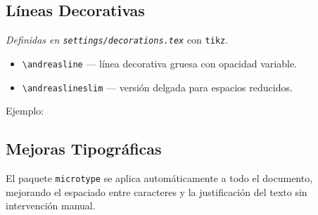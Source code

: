 \documentclass[/work/src/main.tex]{subfiles}
\begin{document}
\subsection{Líneas Decorativas}
\label{sec:decoraciones}

\emph{Definidas en \texttt{settings/decorations.tex}} con \texttt{tikz}.

\begin{itemize}
    \item \texttt{\textbackslash andreasline} — línea decorativa gruesa con opacidad variable.
    \item \texttt{\textbackslash andreaslineslim} — versión delgada para espacios reducidos.
\end{itemize}

Ejemplo:

\andreasline

\subsection{Mejoras Tipográficas}
\label{sec:microtype}

El paquete \texttt{microtype} se aplica automáticamente a todo el documento, mejorando el espaciado entre caracteres y la justificación del texto sin intervención manual.
\end{document}
